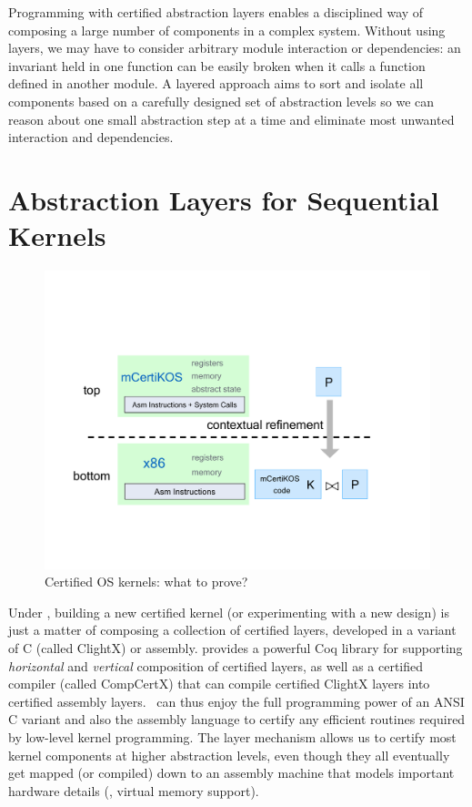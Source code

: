 Programming with certified abstraction layers enables a disciplined way of
composing a large number of components in a complex system. Without
using layers, we may have to consider arbitrary module interaction or
dependencies: an invariant held in one function can be easily broken
when it calls a function defined in another module. A layered approach
aims to sort and isolate all components based on a carefully designed
set of abstraction levels so we can reason about one small abstraction
step at a time and eliminate most unwanted interaction and dependencies.



\section{Abstraction Layers for Sequential Kernels}

\begin{figure}[tb] \centering
\includegraphics[scale=.5]{figs/mainthm}
\caption{Certified OS kernels: what to prove?}
\label{fig:mainthm}
\end{figure}
Under \CTOS, building a new certified kernel (or experimenting with a new
design) is just a matter of composing a collection of certified
layers, developed in a variant of C (called ClightX) or assembly.
\CTOS{} provides  a powerful Coq library
for supporting {\em horizontal} and {\em vertical} composition of
certified layers, as well as a certified compiler (called
CompCertX) that can compile certified ClightX layers into certified
assembly layers. \CTOS\ can thus enjoy the full programming power of
an ANSI C variant and also the assembly language to certify any
efficient routines required by low-level kernel programming.  The
layer mechanism allows us to certify most kernel components at higher
abstraction levels, even though they all eventually get mapped (or
compiled) down to an assembly machine
 that models important hardware details (\eg, virtual memory support).


